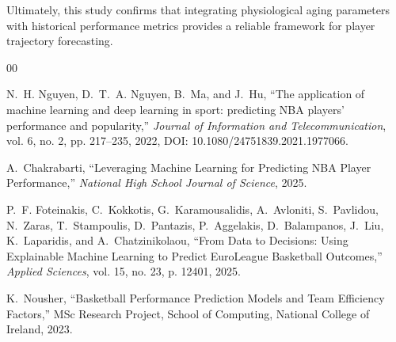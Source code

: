 \documentclass[conference]{IEEEtran}
\begin{document}
Ultimately, this study confirms that integrating physiological aging parameters with historical performance metrics provides a reliable framework for player trajectory forecasting.



\begin{thebibliography}{00}

N.~H. Nguyen, D.~T.~A. Nguyen, B.~Ma, and J.~Hu,
``The application of machine learning and deep learning in sport: predicting NBA players' performance and popularity,''
\textit{Journal of Information and Telecommunication}, vol. 6, no. 2, pp. 217--235, 2022,
DOI: 10.1080/24751839.2021.1977066.

A.~Chakrabarti,
``Leveraging Machine Learning for Predicting NBA Player Performance,''
\textit{National High School Journal of Science}, 2025.

P.~F. Foteinakis, C.~Kokkotis, G.~Karamousalidis, A.~Avloniti, S.~Pavlidou, N.~Zaras, T.~Stampoulis, D.~Pantazis, P.~Aggelakis, D.~Balampanos, J.~Liu, K.~Laparidis, and A.~Chatzinikolaou,
``From Data to Decisions: Using Explainable Machine Learning to Predict EuroLeague Basketball Outcomes,''
\textit{Applied Sciences}, vol. 15, no. 23, p. 12401, 2025.

K.~Nousher,
``Basketball Performance Prediction Models and Team Efficiency Factors,''
MSc Research Project, School of Computing, National College of Ireland, 2023.

\end{thebibliography}
\end{document}
